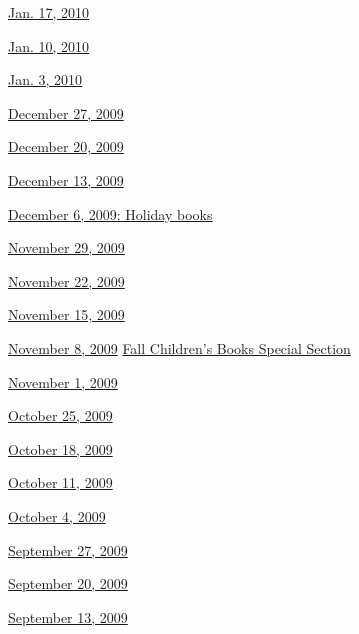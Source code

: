 \href{http://www.nytimes.com/indexes/2010/01/16/books/review/index.html}{Jan.
17, 2010}

\href{http://www.nytimes.com/indexes/2010/01/09/books/review/index.html}{Jan.
10, 2010}

\href{http://www.nytimes.com/indexes/2010/01/02/books/review/index.html}{Jan.
3, 2010}

\href{http://www.nytimes.com/indexes/2009/12/26/books/review/index.html}{December
27, 2009}

\href{http://www.nytimes.com/indexes/2009/12/19/books/review/index.html}{December
20, 2009}

\href{http://www.nytimes.com/indexes/2009/12/12/books/review/index.html}{December
13, 2009}

\href{http://www.nytimes.com/indexes/2009/12/05/books/review/index.html}{December
6, 2009: Holiday books}

\href{http://www.nytimes.com/indexes/2009/11/28/books/review/index.html}{November
29, 2009}

\href{http://www.nytimes.com/indexes/2009/11/21/books/review/index.html}{November
22, 2009}

\href{http://www.nytimes.com/indexes/2009/11/14/books/review/index.html}{November
15, 2009}

\href{http://www.nytimes.com/indexes/2009/11/07/books/review/index.html}{November
8, 2009} \textbar{}
\href{http://www.nytimes.com/indexes/2009/11/07/arts/artsspecial/index.html}{Fall
Children's Books Special Section}

\href{http://www.nytimes.com/indexes/2009/10/31/books/review/index.html}{November
1, 2009}

\href{http://www.nytimes.com/indexes/2009/10/24/books/review/index.html}{October
25, 2009}

\href{http://www.nytimes.com/indexes/2009/10/17/books/review/index.html}{October
18, 2009}

\href{http://www.nytimes.com/indexes/2009/10/10/books/review/index.html}{October
11, 2009}

\href{http://www.nytimes.com/indexes/2009/10/03/books/review/index.html}{October
4, 2009}

\href{http://www.nytimes.com/indexes/2009/09/26/books/review/index.html}{September
27, 2009}

\href{http://www.nytimes.com/indexes/2009/09/19/books/review/index.html}{September
20, 2009}

\href{http://www.nytimes.com/indexes/2009/09/12/books/review/index.html}{September
13, 2009}

